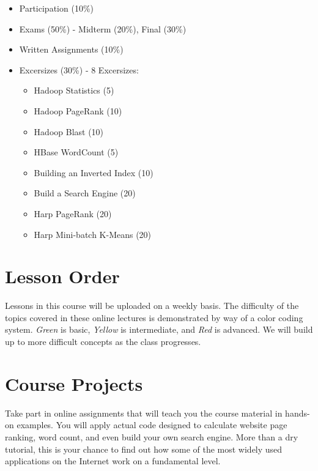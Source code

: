 \begin{itemize}
  \item Participation (10\%)
  \item Exams (50\%) - Midterm (20\%), Final (30\%)
  \item Written Assignments (10\%)
  \item Excersizes (30\%) - 8 Excersizes: 
    \begin{itemize}
      \item Hadoop Statistics (5)
      \item Hadoop PageRank (10)
      \item Hadoop Blast (10)
      \item HBase WordCount (5)
      \item Building an Inverted Index (10)
      \item Build a Search Engine (20)
      \item Harp PageRank (20)
      \item Harp Mini-batch K-Means (20)
    \end{itemize}
\end{itemize}

\section{Lesson Order}

Lessons in this course will be uploaded on a weekly basis. The
difficulty of the topics covered in these online lectures is
demonstrated by way of a color coding system. {\em Green} is basic,
{\em Yellow} is intermediate, and {\em Red} is advanced. We will build
up to more difficult concepts as the class progresses.

\section{Course Projects}

Take part in online assignments that will teach you the course
material in hands-on examples. You will apply actual code designed to
calculate website page ranking, word count, and even build your own
search engine. More than a dry tutorial, this is your chance to find
out how some of the most widely used applications on the Internet work
on a fundamental level.



